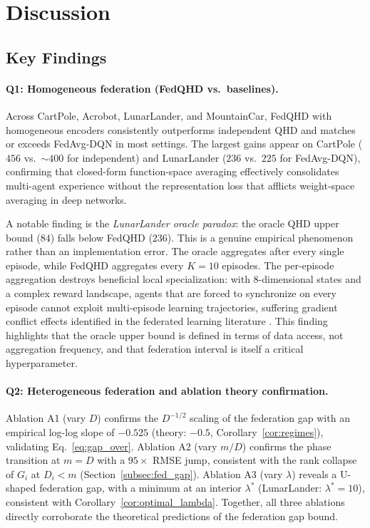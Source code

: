 \section{Discussion}
\label{sec:discussion}

\subsection{Key Findings}
\label{subsec:key_findings}

\paragraph{Q1: Homogeneous federation (FedQHD vs.\ baselines).}
Across CartPole, Acrobot, LunarLander, and MountainCar, FedQHD with homogeneous encoders consistently outperforms independent QHD and matches or exceeds FedAvg-DQN in most settings. The largest gains appear on CartPole ($456$ vs.\ $\sim 400$ for independent) and LunarLander ($236$ vs.\ $225$ for FedAvg-DQN), confirming that closed-form function-space averaging effectively consolidates multi-agent experience without the representation loss that afflicts weight-space averaging in deep networks.

A notable finding is the \emph{LunarLander oracle paradox}: the oracle QHD upper bound ($84$) falls below FedQHD ($236$). This is a genuine empirical phenomenon rather than an implementation error. The oracle aggregates after every single episode, while FedQHD aggregates every $K=10$ episodes. The per-episode aggregation destroys beneficial local specialization: with 8-dimensional states and a complex reward landscape, agents that are forced to synchronize on every episode cannot exploit multi-episode learning trajectories, suffering gradient conflict effects identified in the federated learning literature \citep{li2019convergence}. This finding highlights that the oracle upper bound is defined in terms of data access, not aggregation frequency, and that federation interval is itself a critical hyperparameter.

\paragraph{Q2: Heterogeneous federation and ablation theory confirmation.}
Ablation A1 (vary $D$) confirms the $D^{-1/2}$ scaling of the federation gap with an empirical log-log slope of $-0.525$ (theory: $-0.5$, Corollary~\ref{cor:regimes}), validating Eq.~\eqref{eq:gap_over}. Ablation A2 (vary $m/D$) confirms the phase transition at $m = D$ with a $95\times$ RMSE jump, consistent with the rank collapse of $G_i$ at $D_i < m$ (Section~\ref{subsec:fed_gap}). Ablation A3 (vary $\lambda$) reveals a U-shaped federation gap, with a minimum at an interior $\lambda^*$ (LunarLander: $\lambda^* = 10$), consistent with Corollary~\ref{cor:optimal_lambda}. Together, all three ablations directly corroborate the theoretical predictions of the federation gap bound.


